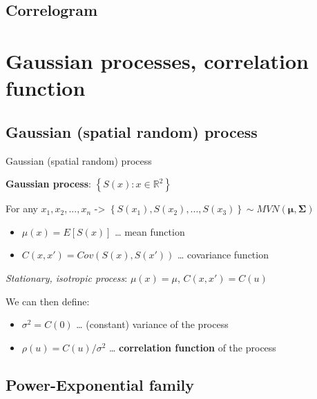 \documentclass[
  ignorenonframetext,
]{beamer}
\providecommand{\tightlist}{%
  \setlength{\itemsep}{0pt}\setlength{\parskip}{0pt}}
\begin{document}
\hypertarget{correlogram}{%
\subsection{Correlogram}\label{correlogram}}

\hypertarget{gaussian-processes-correlation-function}{%
\section{Gaussian processes, correlation
function}\label{gaussian-processes-correlation-function}}

\hypertarget{gaussian-spatial-random-process}{%
\subsection{Gaussian (spatial random)
process}\label{gaussian-spatial-random-process}}

\begin{frame}{Gaussian (spatial random) process}
\small

\textbf{Gaussian process}: \(\left\{S(x):x\in \mathbb{R}^2\right\}\)

For any \(x_1,x_2,...,x_n\) -\textgreater{}
\(\left\{S(x_1),S(x_2),...,S(x_3)\right\}\sim MVN(\boldsymbol\mu, \boldsymbol\Sigma)\)

\begin{itemize}
\item
  \(\mu(x) = E\left[S(x)\right]\) \ldots{} mean function
\item
  \(C(x,x')=Cov\left(S(x),S(x')\right)\) \ldots{} covariance function
\end{itemize}

\emph{Stationary, isotropic process}: \(\mu(x)=\mu\), \(C(x,x')=C(u)\)

We can then define:

\begin{itemize}
\tightlist
\item
  \(\sigma^2=C(0)\) \ldots{} (constant) variance of the process
\end{itemize}

\begin{itemize}
\tightlist
\item
  \(\rho(u)=C(u)/\sigma^2\) \ldots{} \textbf{correlation function} of
  the process
\end{itemize}
\end{frame}

\hypertarget{power-exponential-family}{%
\subsection{Power-Exponential family}\label{power-exponential-family}}
\end{document}
